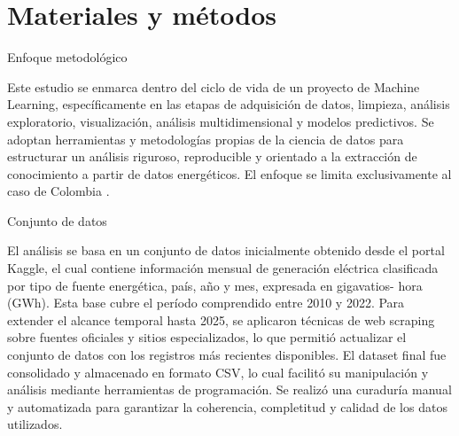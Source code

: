 \documentclass[10pt]{beamer}
\begin{document}
	
	\section[Materiales y m\'etodos]{Materiales y m\'etodos}
	
		\begin{frame}[fragile]{Enfoque metodológico}
		
Este estudio se enmarca dentro del ciclo de vida de un proyecto de Machine Learning, específicamente en las etapas
de adquisición de datos, limpieza, análisis exploratorio, visualización, análisis multidimensional y modelos predictivos. Se adoptan herramientas y metodologías propias de la ciencia de datos para estructurar un análisis riguroso, reproducible y orientado a la extracción de conocimiento a partir de datos energéticos. El enfoque se limita exclusivamente al caso de Colombia \cite{Gacia}.
		
	\end{frame}
			
	
	\begin{frame}[fragile]{Conjunto de datos}
		
		El análisis se basa en un conjunto de datos inicialmente obtenido desde el portal Kaggle, el cual contiene información
		mensual de generación eléctrica clasificada por tipo de fuente energética, país, año y mes, expresada en gigavatios-
		hora (GWh). Esta base cubre el período comprendido entre 2010 y 2022. Para extender el alcance temporal hasta
		2025, se aplicaron técnicas de web scraping sobre fuentes oficiales y sitios especializados, lo que permitió actualizar
		el conjunto de datos con los registros más recientes disponibles.
		El dataset final fue consolidado y almacenado en formato CSV, lo cual facilitó su manipulación y análisis mediante
		herramientas de programación. Se realizó una curaduría manual y automatizada para garantizar la coherencia, 
		completitud y calidad de los datos utilizados.		
	\end{frame}
	
\end{document}

